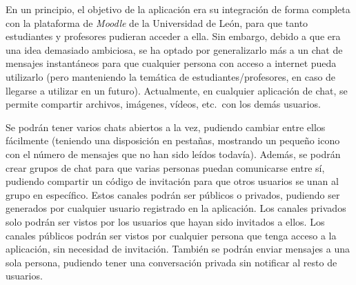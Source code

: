 En un principio, el objetivo de la aplicación era su integración de forma completa con la plataforma de
\textit{Moodle} de la Universidad de León, para que tanto estudiantes y profesores pudieran acceder a ella.
Sin embargo, debido a que era una idea demasiado ambiciosa, se ha optado por generalizarlo más a un chat de
mensajes instantáneos para que cualquier persona con acceso a internet pueda utilizarlo (pero manteniendo la temática
de estudiantes/profesores, en caso de llegarse a utilizar en un futuro).
Actualmente, en cualquier aplicación de chat, se permite compartir archivos, imágenes, vídeos, etc.\ con los demás
usuarios.

Se podrán tener varios chats abiertos a la vez, pudiendo cambiar entre ellos fácilmente (teniendo una disposición en
pestañas, mostrando un pequeño icono con el número de mensajes que no han sido leídos todavía).
Además, se podrán crear grupos de chat para que varias personas puedan
comunicarse entre sí, pudiendo compartir un código de invitación para que otros usuarios se unan al grupo en específico.
Estos canales podrán ser públicos o privados, pudiendo ser generados por cualquier usuario registrado en la
aplicación.
Los canales privados solo podrán ser vistos por los usuarios que hayan sido invitados a ellos.
Los canales públicos podrán ser vistos por cualquier persona que tenga acceso a la aplicación, sin necesidad de
invitación.
También se podrán enviar mensajes a una sola persona, pudiendo tener una conversación privada sin notificar al resto
de usuarios.
